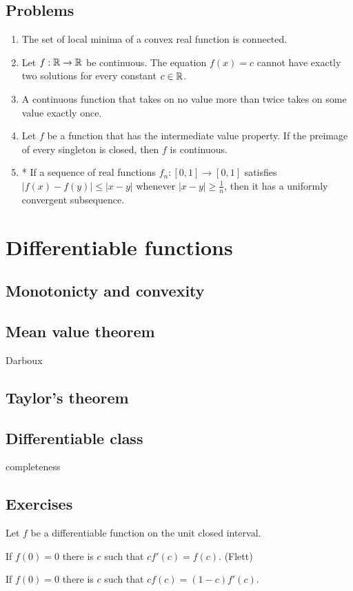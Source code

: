 \documentclass{../note}
\begin{document}
\section*{Problems}
\begin{enumerate}
\item The set of local minima of a convex real function is connected.
\item Let $f:\mathbb{R}\to\mathbb{R}$ be continuous.
The equation $f(x)=c$ cannot have exactly two solutions for every constant $c\in\mathbb{R}$.
\item A continuous function that takes on no value more than twice takes on some value exactly once.
\item Let $f$ be a function that has the intermediate value property.
If the preimage of every singleton is closed, then $f$ is continuous.
\item* If a sequence of real functions $f_n\colon[0,1]\to[0,1]$ satisfies $|f(x)-f(y)|\le|x-y|$ whenever $|x-y|\ge\frac1n$, then it has a uniformly convergent subsequence.
\end{enumerate}

\chapter{Differentiable functions}
\section{Monotonicty and convexity}
\section{Mean value theorem}
Darboux
\section{Taylor's theorem}
\section{Differentiable class}
completeness

\section*{Exercises}
\begin{prb}
Let $f$ be a differentiable function on the unit closed interval.
\begin{parts}
\item If $f(0)=0$ there is $c$ such that $cf'(c)=f(c)$. (Flett)
\item If $f(0)=0$ there is $c$ such that $cf(c)=(1-c)f'(c)$.
\end{parts}
\end{prb}
\end{document}
